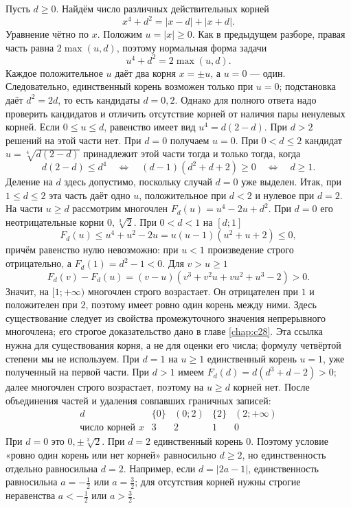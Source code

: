 \begin{example}\label{ex:review-ege-final-parameters-C}
Пусть \(d\ge0\). Найдём число различных действительных корней
\[
x^4+d^2=|x-d|+|x+d|.
\]
Уравнение чётно по \(x\). Положим \(u=|x|\ge0\). Как в предыдущем разборе, правая часть равна \(2\max(u,d)\), поэтому нормальная форма задачи
\[
u^4+d^2=2\max(u,d).
\]
Каждое положительное \(u\) даёт два корня \(x=\pm u\), а \(u=0\) --- один. Следовательно, единственный корень возможен только при \(u=0\); подстановка даёт \(d^2=2d\), то есть кандидаты \(d=0,2\). Однако для полного ответа надо проверить кандидатов и отличить отсутствие корней от наличия пары ненулевых корней.
Если \(0\le u\le d\), равенство имеет вид \(u^4=d(2-d)\). При \(d>2\) решений на этой части нет. При \(d=0\) получаем \(u=0\). При \(0<d\le2\) кандидат \(u=\sqrt[4]{d(2-d)}\) принадлежит этой части тогда и только тогда, когда
\[
d(2-d)\le d^4
\quad\Longleftrightarrow\quad
(d-1)(d^2+d+2)\ge0
\quad\Longleftrightarrow\quad d\ge1.
\]
Деление на \(d\) здесь допустимо, поскольку случай \(d=0\) уже выделен. Итак, при \(1\le d\le2\) эта часть даёт одно \(u\), положительное при \(d<2\) и нулевое при \(d=2\).
На части \(u\ge d\) рассмотрим многочлен \(F_d(u)=u^4-2u+d^2\). При \(d=0\) его неотрицательные корни \(0,\sqrt[3]2\). При \(0<d<1\) на \([d;1]\)
\[
F_d(u)\le u^4+u^2-2u=u(u-1)(u^2+u+2)\le0,
\]
причём равенство нулю невозможно: при \(u<1\) произведение строго отрицательно, а \(F_d(1)=d^2-1<0\). Для \(v>u\ge1\)
\[
F_d(v)-F_d(u)=(v-u)(v^3+v^2u+vu^2+u^3-2)>0.
\]
Значит, на \([1;+\infty)\) многочлен строго возрастает. Он отрицателен при \(1\) и положителен при \(2\), поэтому имеет ровно один корень между ними. Здесь существование следует из свойства промежуточного значения непрерывного многочлена; его строгое доказательство дано в главе \ref{chap:c28}. Эта ссылка нужна для существования корня, а не для оценки его числа; формулу четвёртой степени мы не используем.
При \(d=1\) на \(u\ge1\) единственный корень \(u=1\), уже полученный на первой части. При \(d>1\) имеем \(F_d(d)=d(d^3+d-2)>0\); далее многочлен строго возрастает, поэтому на \(u\ge d\) корней нет.
После объединения частей и удаления совпавших граничных записей:
\[
\begin{array}{c|cccc}
d&\{0\}&(0;2)&\{2\}&(2;+\infty)\\ \hline
\text{число корней }x&3&2&1&0
\end{array}
\]
При \(d=0\) это \(0,\pm\sqrt[3]2\). При \(d=2\) единственный корень \(0\). Поэтому условие «ровно один корень или нет корней» равносильно \(d\ge2\), но единственность отдельно равносильна \(d=2\). Например, если \(d=|2a-1|\), единственность равносильна \(a=-\frac12\) или \(a=\frac32\); для отсутствия корней нужны строгие неравенства \(a<-\frac12\) или \(a>\frac32\).
\end{example}

